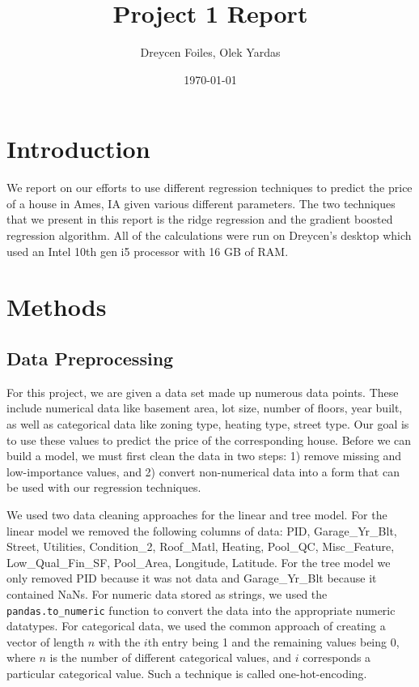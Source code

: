 \documentclass{article}
\title{Project 1 Report}
\author{Dreycen Foiles, Olek Yardas}
\date{\today}
\begin{document}
\maketitle

\section{Introduction}

We report on our efforts to use different regression techniques to predict the price of a house in Ames, IA given various different parameters. The two techniques that we present in this report is the ridge regression and the gradient boosted regression algorithm. All of the calculations were run on Dreycen's desktop which used an Intel 10th gen i5 processor with 16 GB of RAM. 

\section{Methods}

\subsection{Data Preprocessing}
For this project, we are given a data set made up numerous data points. These
include numerical data like basement area,  lot size, number of floors, year
built, as well as categorical data like zoning type, heating type, street type.
Our goal is to use these values to predict the price of the corresponding house.
Before we can build a model, we must first clean the data in two steps:
1) remove missing and low-importance values, and 2) convert non-numerical data
into a form that can be used with our regression techniques. 

We used two data cleaning approaches for the linear and tree model. For the linear model 
we removed the following columns of data:
PID, Garage\_Yr\_Blt, Street, Utilities, Condition\_2, Roof\_Matl, Heating,
Pool\_QC, Misc\_Feature, \\ 
Low\_Qual\_Fin\_SF, Pool\_Area, Longitude, Latitude. For the 
tree model we only removed PID because it was not data and Garage\_Yr\_Blt because 
it contained NaNs. For numeric data stored as strings, we used the \verb,pandas.to_numeric, 
function to convert the data into the appropriate numeric datatypes. For
categorical data, we used the common approach of creating a vector of length
$n$ with the $i$th entry being 1 and the remaining values being 0, where $n$ is
the number of different categorical values, and $i$ corresponds a particular
categorical value. Such a technique is called one-hot-encoding. 
\end{document}
